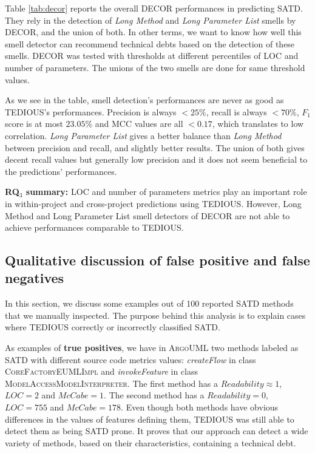 Table \ref{tab:decor} reports the overall DECOR performances in predicting SATD. They rely in the detection of \textit{Long Method} and \textit{Long Parameter List} smells by DECOR, and the union of both. In other terms, we want to know how well this smell detector can recommend technical debts based on the detection of these smells. DECOR was tested with thresholds at different percentiles of LOC and number of parameters. The unions of the two smells are done for same threshold values.

As we see in the table, smell detection's performances are never as good as TEDIOUS's performances. Precision is always $<25\%$, recall is always $<70\%$, $F_1$ score is at most $23.05\%$ and MCC values are all $<0.17$, which translates to low correlation. \textit{Long Parameter List} gives a better balance than \textit{Long Method} between precision and recall, and slightly better results. The union of both gives decent recall values but generally low precision and it does not seem beneficial to the predictions' performances.

\begin{mdframed}
	{\bf RQ$_3$ summary:} LOC and number of parameters metrics play an important role in within-project and cross-project predictions using TEDIOUS. However, Long Method and Long Parameter List smell detectors of DECOR are not able to achieve performances comparable to TEDIOUS.
\end{mdframed}

\subsection{Qualitative discussion of false positive and false negatives}


In this section, we discuss some examples out of 100 reported SATD methods that we manually inspected. The purpose behind this analysis is to explain cases where TEDIOUS correctly or incorrectly classified SATD.

As examples of \textbf{true positives}, we have in \textsc{ArgoUML} two methods labeled as SATD with different source code metrics values: \textit{createFlow} in class \textsc{CoreFactoryEUMLImpl} and \textit{invokeFeature} in class \textsc{ModelAccessModelInterpreter}. The first method has a $Readability\approx1$, $LOC=2$ and $McCabe=1$. The second method has a $Readability=0$, $LOC=755$ and $McCabe=178$. Even though both methods have obvious differences in the values of features defining them, TEDIOUS was still able to detect them as being SATD prone. It proves that our approach can detect a wide variety of methods, based on their characteristics, containing a technical debt.

